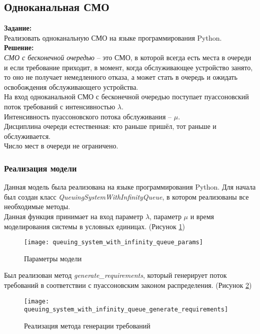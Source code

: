 \subsection*{Одноканальная СМО}

\textbf{Задание:}\\
Реализовать одноканальную СМО на языке программирования Python.\\

\textbf{Решение:}\\
\textit{СМО с бесконечной очередью} -- это СМО, в которой всегда есть места в очереди и если требование приходит, в момент, когда обслуживающее устройство занято, то оно не получает немедленного отказа, а может стать в очередь и ожидать освобождения обслуживающего устройства.\\

На вход одноканальной СМО с бесконечной очередью поступает пуассоновский поток требований с интенсивностью $\lambda$.\\
Интенсивность пуассоновского потока обслуживания -- $\mu$.\\
Дисциплина очереди естественная: кто раньше пришёл, тот раньше и обслуживается.\\
Число мест в очереди не ограничено.

\subsubsection*{Реализация модели}
Данная модель была реализована на языке программирования Python. Для начала был создан класс \textit{QueuingSystemWithInfinityQueue}, в котором реализованы все необходимые методы.\\

Данная функция принимает на вход параметр $\lambda$, параметр $\mu$ и время моделирования системы в условных единицах. (Рисунок \ref{fig:queuing_system_with_infinity_queue_params})
\begin{figure}[h]
	\centering \texttt{[image: queuing\_system\_with\_infinity\_queue\_params]}
	\caption{Параметры модели}
	\label{fig:queuing_system_with_infinity_queue_params}
\end{figure}

\newpage
Был реализован метод \textit{generate\textup{\_}requirements}, который генерирует поток требований в соответствии с пуассоновским законом распределения. (Рисунок \ref{fig:queuing_system_with_infinity_queue_generate_requirements})
\begin{figure}[h]
	\centering \texttt{[image: queuing\_system\_with\_infinity\_queue\_generate\_requirements]}
	\caption{Реализация метода генерации требований}
	\label{fig:queuing_system_with_infinity_queue_generate_requirements}
\end{figure}

